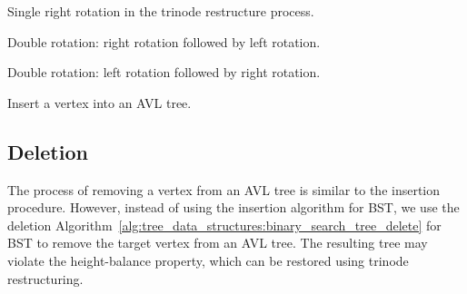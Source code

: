 \begin{algorithm}[!htbp]

\caption{Single right rotation in the trinode restructure process.}
\label{alg:tree_data_structures:single_right_rotation}
\end{algorithm}

\begin{algorithm}[!htbp]

\caption{Double rotation: right rotation followed by left rotation.}
\label{alg:tree_data_structures:right_left_rotation}
\end{algorithm}

\begin{algorithm}[!htbp]

\caption{Double rotation: left rotation followed by right rotation.}
\label{alg:tree_data_structures:left_right_rotation}
\end{algorithm}

\begin{algorithm}[!htbp]

\caption{Insert a vertex into an AVL tree.}
\label{alg:tree_data_structures:AVL-insert}
\end{algorithm}



\subsection{Deletion}

The process of removing a vertex from an AVL tree is similar to the
insertion procedure. However, instead of using the insertion algorithm
for BST, we use the deletion
Algorithm~\ref{alg:tree_data_structures:binary_search_tree_delete} for
BST to remove the target vertex from an AVL tree. The resulting tree
may violate the height-balance property, which can be restored using
trinode restructuring.


